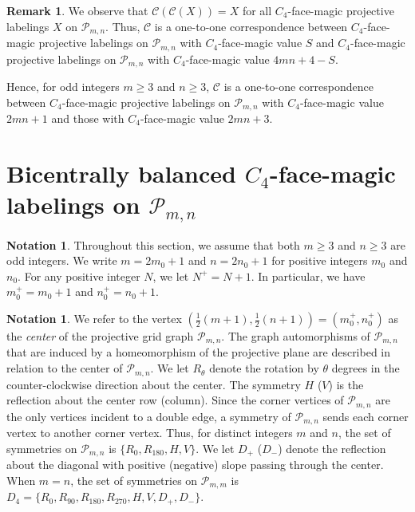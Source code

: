 \documentclass[12pt]{amsart}
\theoremstyle{definition}
\newtheorem{notation}[definition]{Notation}
\newtheorem{remark}[definition]{Remark}
\theoremstyle{plain}
\begin{document}
\begin{remark} \label{remOrderComplementLabelingCorrespondence}
  We observe that $\mathcal{C}(\mathcal{C}(X))=X$ for all $C_4$-face-magic projective labelings
  $X$ on $\mathcal{P}_{m,n}$.
  Thus, $\mathcal{C}$ is a one-to-one correspondence between
  $C_4$-face-magic projective labelings on $\mathcal{P}_{m,n}$ with $C_4$-face-magic value $S$ and
  $C_4$-face-magic projective labelings on $\mathcal{P}_{m,n}$ with $C_4$-face-magic value $4mn+4-S$.

  Hence, for odd integers $m\geqslant 3$ and $n \geqslant 3$,
  $\mathcal{C}$ is a one-to-one correspondence between
  $C_4$-face-magic projective labelings on $\mathcal{P}_{m,n}$ with $C_4$-face-magic value $2mn+1$ and
  those with $C_4$-face-magic value $2mn+3$.
\end{remark}

\section{Bicentrally balanced $C_4$-face-magic labelings on $\mathcal{P}_{m,n}$} \label{S:NonstandardSumProjectiveGrid}

\begin{notation}
Throughout this section, we assume that both $m\geqslant 3$ and $n\geqslant 3$ are odd integers.
We write $m=2m_0 +1$ and $n=2n_0 +1$ for positive integers $m_0$ and $n_0$.
For any positive integer $N$, we let $N^{+}=N+1$.
In particular, we have $m_0^{+}=m_0 +1$ and $n_0^{+}=n_0 +1$.
\end{notation}

\begin{notation}
  We refer to the vertex $(\tfrac{1}{2}(m+1),\tfrac{1}{2}(n+1))=(m_0^{+},n_0^{+})$ as the \textit{center} of the projective grid graph $\mathcal{P}_{m,n}$.
  The graph automorphisms of $\mathcal{P}_{m,n}$ that are induced by a homeomorphism of the projective plane are
  described in relation to the center of $\mathcal{P}_{m,n}$.
  We let $R_{\theta}$ denote the rotation by $\theta$ degrees in the counter-clockwise direction about the center.
  The symmetry $H$ ($V$) is the reflection about the center row (column).
  Since the corner vertices of $\mathcal{P}_{m,n}$ are the only vertices incident to a double edge,
  a symmetry of $\mathcal{P}_{m,n}$ sends each corner vertex to another corner vertex.
  Thus, for distinct integers $m$ and $n$, the set of symmetries on $\mathcal{P}_{m,n}$ is $\{ R_{0}, R_{180}, H, V\}$.
  We let $D_{+}$ ($D_{-}$) denote the reflection about the diagonal with positive (negative) slope passing through the center.
  When $m=n$, the set of symmetries on $\mathcal{P}_{m,m}$ is
  $D_4=\{R_{0}, R_{90}, R_{180}, R_{270}, H, V, D_{+}, D_{-}\}$.
\end{notation}
\end{document}
